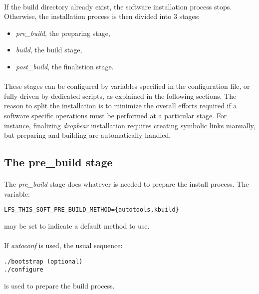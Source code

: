 \documentclass[a4paper, 11pt]{article}
\begin{document}
\paragraph{}
If the build directory already exist, the software installation process stops.
Otherwise, the installation process is then divided into 3 stages:
\begin{itemize}
\item \textit{pre\_build}, the preparing stage,
\item \textit{build}, the build stage,
\item \textit{post\_build}, the finalistion stage.
\end{itemize}

\paragraph{}
These stages can be configured by variables specified in the configuration file,
or fully driven by dedicated scripts, as explained in the following sections.
The reason to split the installation is to minimize the overall efforts required
if a software specific operations must be performed at a particular stage. For
instance, finalizing \textit{dropbear} installation requires creating symbolic
links manually, but preparing and building are automatically handled.

\subsection{The pre\_build stage}
\paragraph{}
The \textit{pre\_build} stage does whatever is needed to prepare the install
process. The variable:\\

\begin{lstlisting}[frame=tb]
LFS_THIS_SOFT_PRE_BUILD_METHOD={autotools,kbuild}
\end{lstlisting}
may be set to indicate a default method to use.

\paragraph{}
If \textit{autoconf} is used, the usual sequence:\\

\begin{lstlisting}[frame=tb]
./bootstrap (optional)
./configure
\end{lstlisting}
is used to prepare the build process.
\end{document}
